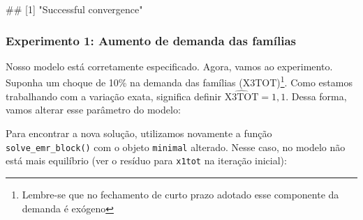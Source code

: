\documentclass[12pt,twoside]{article}
\newenvironment{Shaded}{\begin{snugshade}}{\end{snugshade}}
\newcommand{\CommentTok}[1]{\textcolor[rgb]{0.56,0.35,0.01}{\textit{#1}}}
\newcommand{\DataTypeTok}[1]{\textcolor[rgb]{0.13,0.29,0.53}{#1}}
\newcommand{\FloatTok}[1]{\textcolor[rgb]{0.00,0.00,0.81}{#1}}
\newcommand{\KeywordTok}[1]{\textcolor[rgb]{0.13,0.29,0.53}{\textbf{#1}}}
\newcommand{\NormalTok}[1]{#1}
\newcommand{\OperatorTok}[1]{\textcolor[rgb]{0.81,0.36,0.00}{\textbf{#1}}}
\newcommand{\StringTok}[1]{\textcolor[rgb]{0.31,0.60,0.02}{#1}}
\let\oldShaded\Shaded
\let\endoldShaded\endShaded
\renewenvironment{Shaded}{\footnotesize\oldShaded}{\endoldShaded}
\let\oldverbatim\verbatim
\let\endoldverbatim\endverbatim
\renewenvironment{verbatim}{\footnotesize\oldverbatim}{\endoldverbatim}
\let\rmarkdownfootnote\footnote%
\def\footnote{\protect\rmarkdownfootnote}
\begin{document}
\begin{Shaded}
\end{Shaded}

\begin{verbatim}
## [1] "Successful convergence"
\end{verbatim}

\hypertarget{experimento-1-aumento-de-demanda-das-famuxedlias}{%
\subsubsection{Experimento 1: Aumento de demanda das
famílias}\label{experimento-1-aumento-de-demanda-das-famuxedlias}}

Nosso modelo está corretamente especificado. Agora, vamos ao
experimento. Suponha um choque de 10\% na demanda das famílias
(X3TOT)\footnote{Lembre-se que no fechamento de curto prazo adotado esse
  componente da demanda é exógeno}. Como estamos trabalhando com a
variação exata, significa definir \(\hat{\text{X3TOT}} = 1,1\). Dessa
forma, vamos alterar esse parâmetro do modelo:

\begin{Shaded}
\end{Shaded}

Para encontrar a nova solução, utilizamos novamente a função
\texttt{solve\_emr\_block()} com o objeto \texttt{minimal} alterado.
Nesse caso, no modelo não está mais equilíbrio (ver o resíduo para
\texttt{x1tot} na iteração inicial):

\begin{Shaded}
\end{Shaded}
\end{document}
